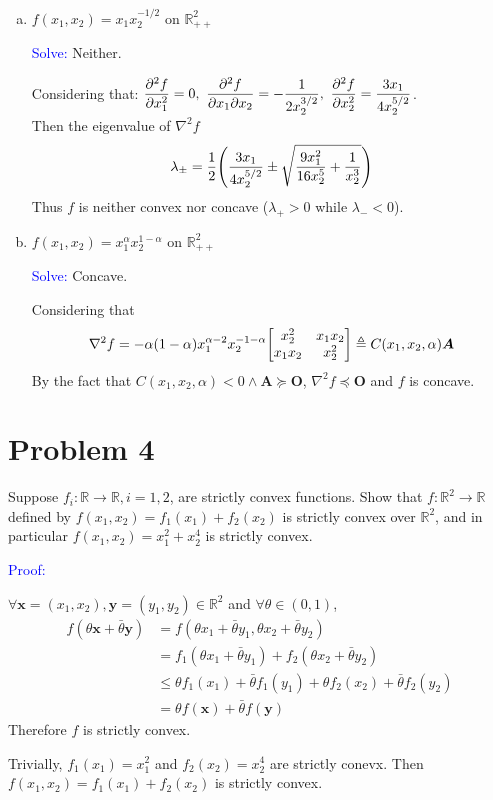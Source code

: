 \documentclass{article}
\def\RR{\mathbb{R}}
\def\bx{\boldsymbol{x}}
\def\by{\boldsymbol{y}}
\def\bA{\boldsymbol{A}}
\def\bO{\boldsymbol{O}}
\def\convex#1#2{\theta#1+\bar{\theta}#2}
\def\Esolve{\textcolor{blue}{Solve: }}
\def\Eproof{\textcolor{blue}{Proof: }}
\begin{document}
\begin{enumerate}[(a)]
	\item $f(x_1,x_2)=x_1x_2^{-1/2}$ on $\RR_{++}^2$

		\Esolve Neither.

		Considering that:
		$\displaystyle{\pdv[2]{f}{x_1}=0,\ \pdv{f}{x_1}{x_2}=-\dfrac{1}{2x_2^{3/2}},\ \pdv[2]{f}{x_2}=\dfrac{3x_1}{4x_2^{5/2}}}$. \\

		Then the eigenvalue of $\nabla^2f$ 
		$$
		\lambda_{\pm}=\frac12\qty(\dfrac{3x_1}{4x_2^{5/2}}
			\pm
		\sqrt{\dfrac{9x_1^2}{16x_2^5}+\dfrac{1}{x_2^3}})
		$$
		Thus $f$ is neither convex nor concave ($\lambda_+>0$ while $\lambda_-<0$).



	\item $f(x_1,x_2)=x_1^\alpha x_2^{1-\alpha}$ on $\RR_{++}^2$

		\Esolve Concave.

		Considering that 
		$$
		\nabla^2f
		=
		-\alpha(1-\alpha)x_1^{\alpha-2}x_2^{-1-\alpha}
		\mqty[x_2^2 & x_1x_2 \\ x_1x_2 & x_2^2]
		\triangleq
		C(x_1,x_2,\alpha)\bA
		$$
		By the fact that 
		$C(x_1,x_2,\alpha)<0\land \bA\succeq\bO$, 
		$\nabla^2f\preceq\bO$ and $f$ is concave.
\end{enumerate}

\newpage

\section*{Problem 4}

Suppose $f_i:\RR\to\RR, i=1,2$, are strictly convex functions. Show that $f:\RR^2\to\RR$ defined by $f(x_1,x_2) = f_1(x_1)+f_2(x_2)$ is strictly convex over $\RR^2$, and in particular $f(x_1,x_2) = x_1^2 +x_2^4$ is strictly convex.

\Eproof

$\forall\bx=(x_1,x_2),\by=(y_1,y_2)\in\RR^2$ and $\forall\theta\in(0,1)$, 
$$
\begin{aligned}
	f(\convex{\bx}{\by})
	&=f(\convex{x_1}{y_1},\convex{x_2}{y_2})
	\\
	&=
	f_1(\convex{x_1}{y_1})+f_2(\convex{x_2}{y_2})
	\\
	&\le
	\convex{f_1(x_1)}{f_1(y_1)}+\convex{f_2(x_2)}{f_2(y_2)}
	\\
	&=
	\convex{f(\bx)}{f(\by)}
\end{aligned}
$$
Therefore $f$ is strictly convex.

Trivially, $f_1(x_1)=x_1^2$ and $f_2(x_2)=x_2^4$ are strictly conevx. Then $f(x_1,x_2)=f_1(x_1)+f_2(x_2)$ is strictly convex.
\end{document}
